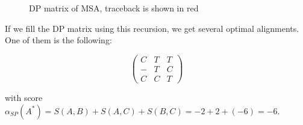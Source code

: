 \documentclass[%
   10pt,              %
   nenglish,           %
   a4paper,           %
   DIV11,             %
]{scrartcl}%
\begin{document}
\begin{figure}[ht]
\centering
{}
\caption[DP matrix of MSA]{DP matrix of MSA, traceback is shown in red}
\end{figure}

\noindent If we fill the DP matrix using this recursion, we get several optimal alignments. One of 
them is the following:

\begin{equation}
 \begin{pmatrix}
  C & T & T \\
  - & T & C \\
  C & C & T
 \end{pmatrix}
\end{equation}

\noindent with score $\alpha_{SP}(A^*) = S(A,B) + S(A,C) + S(B,C) = -2 + 2 + (-6) = -6$.
\end{document}
